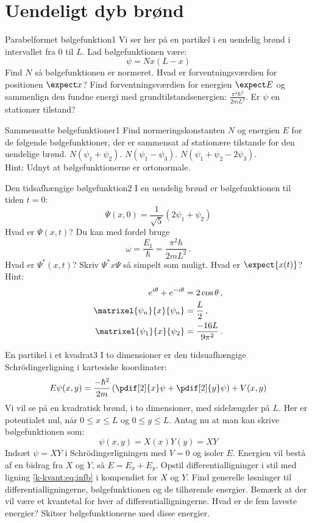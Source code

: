 \section*{Uendeligt dyb brønd}
\begin{opgave}{Parabelformet bølgefunktion}{1}\label{kvant:opg:parabel}
Vi ser her på en partikel i en uendelig brønd i intervallet fra $0$ til $L$. Lad bølgefunktionen være:
$$
\psi = Nx(L-x) 
$$
\opg Find $N$ så bølgefunktionen er normeret.
\opg Hvad er forventningsværdien for positionen $\expect x$?
\opg Find forventningsværdien for energien $\expect E$ og sammenlign den fundne energi med grundtilstandsenergien: $\frac{\pi^2\hbar^2}{2mL^2}$.
\opg Er $\psi$ en stationær tilstand?
\end{opgave}
%
\begin{opgave}{Sammensatte bølgefunktioner}{1}
Find normeringskonstanten $N$ og energien $E$ for de følgende bølgefunktioner, der er sammensat af stationære tilstande for den uendelige brønd.
\opg $N(\psi_1+\psi_2)$.
\opg $N(\psi_1-\psi_3)$.
\opg $N(\psi_1+\psi_2-2\psi_3)$.\\
Hint: Udnyt at bølgefunktionerne er ortonormale.
\end{opgave}
%
\begin{opgave}{Den tidsafhængige bølgefunktion}{2}
I en uendelig brønd er bølgefunktionen til tiden $t=0$:
$$
\Psi(x,0) = \frac{1}{\sqrt{5}}(2\psi_1+\psi_2) 
$$
\opg Hvad er $\Psi(x,t)$? Du kan med fordel bruge 
$$
\omega = \frac{E_1}{\hbar} = \frac{\pi^2\hbar}{2mL^2} \, .
$$
\opg Hvad er $\Psi^*(x,t)$?
\opg Skriv $\Psi^*x\Psi$ så simpelt som muligt.
\opg Hvad er $\expect{x(t)}$? \\
Hint:
\begin{align*}
e^{i\theta}+e^{-i\theta} &= 2\cos \theta \, , \\ \matrixel{\psi_n}{x}{\psi_n} &= \frac{L}{2} \, , \\  \matrixel{\psi_1}{x}{\psi_2} &= \frac{-16L}{9\pi^2} \, .
\end{align*}
\end{opgave}
%
\begin{opgave}{En partikel i et kvadrat}{3}
I to dimensioner er den tidsuafhængige Schrödingerligning i kartesiske koordinater:
$$
E\psi(x,y) = \frac{-\hbar^2}{2m}\left(\pdif[2]{x}\psi +\pdif[2]{y}\psi\right) + V(x,y)
$$
Vi vil se på en kvadratisk brønd, i to dimensioner, med sidelængder på $L$. Her er potentialet nul, når $0\leq x\leq L$ og $0\leq y\leq L$.
Antag nu at man kan skrive bølgefunktionen som:
 $$\psi(x,y) = X(x)Y(y) = XY$$
\opg Indsæt $\psi = XY$ i Schrödingerligningen med $V=0$ og isoler $E$.
\opg Energien vil bestå af en bidrag fra $X$ og $Y$, så $E=E_x+E_y$. Opstil differentialligninger i stil med ligning \eqref{k-kvant:eq:infb} i kompendiet for $X$ og $Y$.
\opg Find generelle løsninger til differentialligningerne, bølgefunktionen og de tilhørende energier. Bemærk at der vil være et kvantetal for hver af differentialligningerne. 
\opg Hvad er de fem laveste energier? Skitser bølgefunktionerne med disse energier.
\end{opgave}
